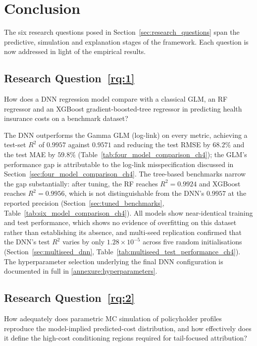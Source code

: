 
\section{Conclusion}
\label{sec:conclusion}

The six research questions posed in Section~\ref{sec:research_questions}
span the predictive, simulation and explanation stages of the framework.
Each question is now addressed in light of the empirical results.

\subsection{Research Question~\ref{rq:1}}
How does a DNN regression model compare with a
classical GLM, an RF regressor and an XGBoost gradient-boosted-tree
regressor in predicting health insurance costs on a benchmark dataset?

The DNN outperforms the Gamma GLM (log-link) on every
metric, achieving a test-set \ensuremath{R^2} of $0.9957$ against $0.9571$ and
reducing the test RMSE by $68.2\%$ and the test MAE by
$59.8\%$ (Table~\ref{tab:four_model_comparison_ch4}); the GLM's
performance gap is attributable to the log-link misspecification
discussed in Section~\ref{sec:four_model_comparison_ch4}.  The
tree-based benchmarks narrow the gap substantially: after tuning, the
RF reaches $R^2 = 0.9924$ and XGBoost reaches
$R^2 = 0.9956$, which is not distinguishable from the DNN's
$0.9957$ at the reported precision (Section~\ref{sec:tuned_benchmarks},
Table~\ref{tab:six_model_comparison_ch4}).  All models show
near-identical training and test performance, which shows no evidence of
overfitting on this dataset rather than establishing its absence,
and multi-seed replication confirmed that the DNN's test \ensuremath{R^2}
varies by only $1.28 \times 10^{-5}$ across five random initialisations
(Section~\ref{sec:multiseed_dnn},
Table~\ref{tab:multiseed_test_performance_ch4}).  The hyperparameter
selection underlying the final DNN configuration is documented in
full in \ref{annexure:hyperparameters}.

\subsection{Research Question~\ref{rq:2}}
How adequately does parametric MC simulation of policyholder
profiles reproduce the model-implied predicted-cost distribution, and
how effectively does it define the high-cost conditioning regions
required for tail-focused attribution?

